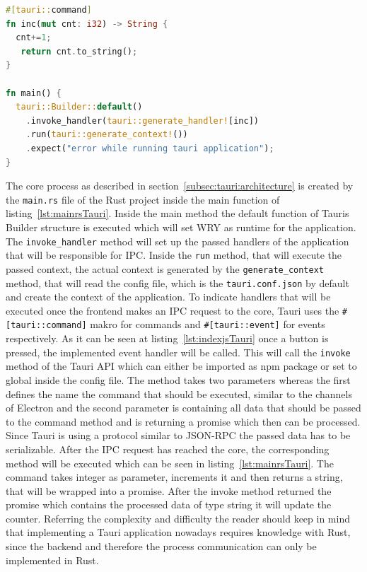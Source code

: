 \begin{lstlisting}[language=Rust,label={lst:mainrsTauri}, caption={Excerpt of main.rs}]
#[tauri::command]
fn inc(mut cnt: i32) -> String {
  cnt+=1;
   return cnt.to_string();
}

fn main() {
  tauri::Builder::default()
    .invoke_handler(tauri::generate_handler![inc])
    .run(tauri::generate_context!())
    .expect("error while running tauri application");
}
\end{lstlisting}
The core process as described in section~\ref{subsec:tauri:architecture} is created by the \texttt{main.rs} file of the Rust project inside the main function of listing~\ref{lst:mainrsTauri}.
Inside the main method the default function of Tauris Builder structure is executed which will set WRY as runtime for the application.
The \texttt{invoke\_handler} method will set up the passed handlers of the application that will be responsible for \ac{IPC}.
Inside the \texttt{run} method, that will execute the passed context, the actual context is generated by the \texttt{generate\_context} method, that will read the config file, which is the \texttt{tauri.conf.json} by default and create the context of the application.
To indicate handlers that will be executed once the frontend makes an \ac{IPC} request to the core, Tauri uses the \texttt{\#[tauri::command]} makro for commands and \texttt{\#[tauri::event]} for events respectively.
As it can be seen at listing~\ref{lst:indexjsTauri} once a button is pressed, the implemented event handler will be called. 
This will call the \texttt{invoke} method of the Tauri \ac{API} which can either be imported as npm package or set to global inside the config file.
The method takes two parameters whereas the first defines the name the command that should be executed, similar to the channels of Electron and the second parameter is containing all data that should
be passed to the command method and is returning a promise which then can be processed.
Since Tauri is using a protocol similar to \ac{JSON-RPC} the passed data has to be serializable.
After the \ac{IPC} request has reached the core, the corresponding method will be executed which can be seen in listing~\ref{lst:mainrsTauri}.
The command takes integer as parameter, increments it and then returns a string, that will be wrapped into a promise.
After the invoke method returned the promise which contains the processed data of type string it will update the counter.
Referring the complexity and difficulty the reader should keep in mind that implementing a Tauri application nowadays requires knowledge with Rust, since the backend and therefore the process communication can only be implemented in Rust.
